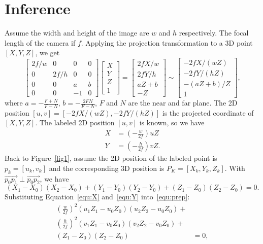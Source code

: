 \documentclass[a4paper]{article}
\begin{document}
\section{Inference}
\label{sec:inference}
Assume the width and height of the image are $w$ and $h$ respectively. The focal length of the camera if $f$.
Applying the projection transformation to a 3D point $[X,Y,Z]$, we get
\begin{equation}
 \begin{bmatrix}2f/w & 0 & 0 & 0 \\0 & 2f/h & 0 & 0\\ 0 & 0 & a & b\\ 0 & 0 & -1 & 0 \end{bmatrix}  \begin{bmatrix}X\\Y\\Z\\1 \end{bmatrix} = 
 \begin{bmatrix} 2fX/w\\2fY/h\\aZ+b\\-Z \end{bmatrix} \sim \begin{bmatrix} -2fX/(wZ)\\-2fY/(hZ)\\-(aZ+b)/Z\\1 \end{bmatrix},
\end{equation}
where $a = -\frac{F+N}{F-N}$, $b = -\frac{2FN}{F-N}$, $F$ and $N$ are the near and far plane.
The 2D position $[u,v]=[-2fX/(wZ), -2fY/(hZ)]$ is the projected coordinate of $[X,Y,Z]$.
The labeled 2D position $[u,v]$ is known, so we have
\begin{align}
X&=(-\frac{w}{2f})uZ \label{equ:X}\\
Y&=(-\frac{h}{2f})vZ\label{equ:Y}.
\end{align}
Back to Figure~\ref{fig1}, assume the 2D position of the labeled point is $p_k=[u_k,v_k]$ and the corresponding 3D position is $P_K=[X_k,Y_k,Z_k]$.
With $\overrightarrow{p_0p_1} \perp \overrightarrow{p_0p_2}$, we have
\begin{equation}
(X_1-X_0)(X_2-X_0)+(Y_1-Y_0)(Y_2-Y_0)+(Z_1-Z_0)(Z_2-Z_0)=0\label{equ:prep}.
\end{equation}
Substituting Equation~\ref{equ:X} and~\ref{equ:Y} into~\ref{equ:prep}:
\begin{align}
(\frac{w}{2f})^2(u_1Z_1-u_0Z_0)(u_2Z_2-u_0Z_0)+ & \nonumber\\
(\frac{h}{2f})^2(v_1Z_1-v_0Z_0)(v_2Z_2-v_0Z_0)+ & \nonumber\\
(Z_1-Z_0)(Z_2-Z_0) &=0,
\end{align}
\end{document}
